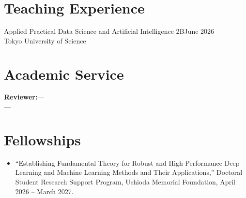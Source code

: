 \documentclass[11pt,a4paper]{article}
\newcommand{\experienceentry}[3]{%
  #1\hfill #2\\
  #3\par\vspace{4pt}
}
\begin{document}
\section{Teaching Experience}

\experienceentry
  {Applied Practical Data Science and Artificial Intelligence 2B}
  {June 2026}
  {Tokyo University of Science}

\section{Academic Service}

\experienceentry
{\textbf{Reviewer:}}
{---}
{---}
\section{Fellowships}

\begin{itemize}
    \item ``Establishing Fundamental Theory for Robust and High-Performance
    Deep Learning and Machine Learning Methods and Their Applications,''
    Doctoral Student Research Support Program, Ushioda Memorial Foundation,
    April 2026 -- March 2027.
\end{itemize}
\end{document}
